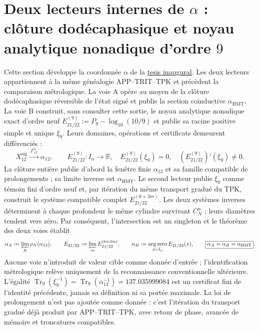 
\section{Deux lecteurs internes de \texorpdfstring{\(\alpha\)}{alpha} : clôture dodécaphasique et noyau analytique nonadique d'ordre \texorpdfstring{\(9\)}{9}}
\label{sec:l9s102:alpha-dos-vias}

Cette section développe la coordonnée \(\alpha\) de la
\hyperref[sec:tesis-inaugural-helicoidal-hmt-md]{tesis inaugural}. Les deux
lecteurs appartiennent à la même généalogie APP--TRIT--TPK et précèdent la
comparaison métrologique. La voie A opère au moyen de la clôture dodécaphasique
réversible de l'état signé et publie la section coinductive
\(\alpha_{\mathrm{HMT}}\). La voie B construit, sans consulter cette sortie, le
noyau analytique nonadique exact d'ordre neuf
\(E_{21/22}^{(9)}:=P_9-\log_{10}(10/9)\) et publie sa racine positive simple et
unique \(\xi_9\). Leurs domaines, opérations et certificats demeurent
différenciés :
\begin{equation}
 X_{12}^{\mathrm{sig}}
 \xrightarrow{\ \Gamma_{12}^{\alpha}\ }
 \alpha_{12},
 \qquad
 E_{21/22}^{(9)}:I_\alpha\longrightarrow\mathbb R,
 \quad E_{21/22}^{(9)}(\xi_9)=0,
 \quad (E_{21/22}^{(9)})'(\xi_9)\ne0.
 \label{eq:l9s102:alpha-dos-mapas}
\end{equation}
La clôture entière publie d'abord la fenêtre finie \(\alpha_{12}\) et sa
famille compatible de prolongements ; sa limite inverse est
\(\alpha_{\mathrm{HMT}}\). Le second lecteur publie \(\xi_9\) comme témoin
fini d'ordre neuf et, par itération du même transport gradué du TPK,
construit le système compatible complet
\(E_{21/22}^{(6+3m)}\). Les deux systèmes inverses déterminent à chaque
profondeur le même cylindre survivant \(C_N^\alpha\) ; leurs diamètres
tendent vers zéro. Par conséquent, l'intersection est un singleton et le théorème des
deux voies établit
\begin{equation}
 \alpha_A:=\varprojlim_N\rho_N(\alpha_{12}),
 \qquad
 E_{21/22}:=\varprojlim_m E_{21/22}^{(6+3m)},
 \qquad
 \alpha_B:=\operatorname*{arg\,zero}_{x\in I_\alpha}E_{21/22}(x),
 \qquad
 \boxed{\alpha_A=\alpha_B=\alpha_{\mathrm{HMT}}}.
 \label{eq:l9s102:alpha-identidad-limite-dos-vias}
\end{equation}
Aucune voie n'introduit de valeur cible comme donnée d'entrée ;
l'identification métrologique relève uniquement de la reconnaissance
conventionnelle ultérieure. L'égalité
\(\operatorname{Tr}_9(\xi_9^{-1})=
\operatorname{Tr}_9(\alpha_{12}^{-1})=137.035999084\) est un certificat
fini de l'identité précédente, jamais sa définition ni sa portée maximale.
La loi de prolongement n'est pas ajoutée comme donnée : c'est l'itération du transport
gradué déjà produit par APP--TRIT--TPK, avec retour de phase, avancée de
mémoire et troncatures compatibles.

